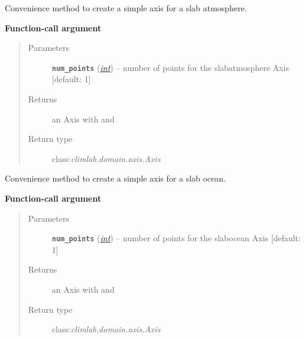 \documentclass[letterpaper,10pt,english]{sphinxmanual}
\begin{document}
\begin{fulllineitems}
\label{api/climlab.domain:climlab.domain.domain.make_slabatm_axis}
Convenience method to create a simple axis for a slab atmosphere.

\textbf{Function-call argument}
\begin{quote}\begin{description}
\item[{Parameters}] \leavevmode
\textbf{\texttt{num\_points}} (\href{http://docs.python.org/2.7/library/functions.html\#int}{\emph{int}}) -- number of points for the slabatmosphere Axis {[}default: 1{]}

\item[{Returns}] \leavevmode
an Axis with  and 

\item[{Return type}] \leavevmode
class:\emph{climlab.domain.axis.Axis}

\end{description}\end{quote}

\end{fulllineitems}


\begin{fulllineitems}
\label{api/climlab.domain:climlab.domain.domain.make_slabocean_axis}
Convenience method to create a simple axis for a slab ocean.

\textbf{Function-call argument}
\begin{quote}\begin{description}
\item[{Parameters}] \leavevmode
\textbf{\texttt{num\_points}} (\href{http://docs.python.org/2.7/library/functions.html\#int}{\emph{int}}) -- number of points for the slabocean Axis {[}default: 1{]}

\item[{Returns}] \leavevmode
an Axis with  and 

\item[{Return type}] \leavevmode
class:\emph{climlab.domain.axis.Axis}

\end{description}\end{quote}

\end{fulllineitems}
\end{document}
